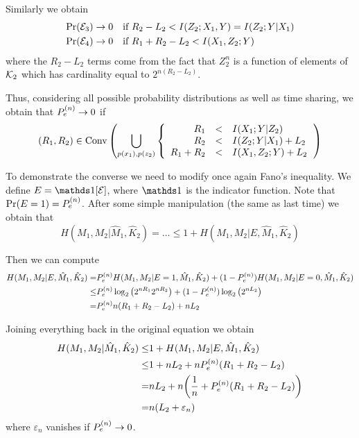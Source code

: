 Similarly we obtain
%
\begin{align}
\begin{split}
\Pr(\mathcal{E}_3) \rightarrow 0 \quad& \text{if } R_2-L_2 < I(Z_2;X_1,Y) = I(Z_2;Y|X_1)\\
\Pr(\mathcal{E}_4) \rightarrow 0 \quad& \text{if } R_1+R_2-L_2 < I(X_1,Z_2;Y)
\end{split}
\end{align}
%
where the $R_2-L_2$ terms come from the fact that $Z_2^n$ is a function of elements of $\mathcal{K}_2$ which has cardinality equal to $2^{n(R_2-L_2)}$.

Thus, considering all possible probability distributions as well as time sharing, we obtain that $ P_e^{(n)}  \rightarrow 0$ if
%
\begin{equation}
(R_1,R_2) \in \operatorname{Conv} \qty(\bigcup_{p(x_1),p(z_2)}
\left\{
\begin{array}{rcl}
R_1 &<& I(X_1;Y|Z_2)\\
R_2 &<& I(Z_2;Y|X_1) + L_2\\
R_1+R_2 &<& I(X_1,Z_2;Y) + L_2
\end{array}
\right.
)
\end{equation}


To demonstrate the converse we need to modify once again Fano's inequality. We define $E = \indicator[\E]$, where $\indicator$ is the indicator function. Note that $\Pr(E=1) =  P_e^{(n)} $. After some simple manipulation (the same as last time) we obtain that
%
\begin{equation}
H(M_1,M_2|\hat{M}_1,\hat{K}_2) = \ldots \leq 1 + H(M_1,M_2|E,\hat{M}_1,\hat{K}_2)
\end{equation}

Then we can compute
%
\begin{align}
\begin{split}
H(M_1,M_2|E,\hat{M}_1,\hat{K}_2) =&  P_e^{(n)}  H(M_1,M_2|E=1,\hat{M}_1,\hat{K}_2) + (1- P_e^{(n)} ) H(M_1,M_2|E=0,\hat{M}_1,\hat{K}_2)\\
\leq&  P_e^{(n)}  \log_2 \qty(2^{nR_1}2^{nR_2}) + (1- P_e^{(n)} ) \log_2 \qty(2^{nL_2})\\
=&  P_e^{(n)}  n(R_1+R_2-L_2) + nL_2
\end{split}
\end{align}

Joining everything back in the original equation we obtain
\begin{align}
\begin{split}
H(M_1,M_2|\hat{M}_1,\hat{K}_2) \leq& 1 + H(M_1,M_2|E,\hat{M}_1,\hat{K}_2)\\
\leq& 1 + nL_2 + n P_e^{(n)}  (R_1+R_2-L_2)\\
=& nL_2 + n \qty(\frac{1}{n} +  P_e^{(n)}  (R_1+R_2-L_2))\\
=& n (L_2 + \varepsilon_n)
\end{split}
\end{align}
where $\varepsilon_n$ vanishes if $ P_e^{(n)}  \rightarrow 0$.

